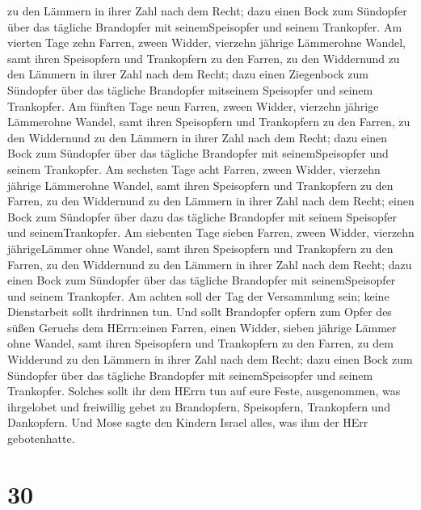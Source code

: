 zu den Lämmern in ihrer Zahl nach dem Recht;  dazu einen
Bock zum Sündopfer über das tägliche Brandopfer mit seinemSpeisopfer und
seinem Trankopfer.  Am vierten Tage zehn Farren, zween
Widder, vierzehn jährige Lämmerohne Wandel,  samt ihren
Speisopfern und Trankopfern zu den Farren, zu den Widdernund zu den
Lämmern in ihrer Zahl nach dem Recht;  dazu einen
Ziegenbock zum Sündopfer über das tägliche Brandopfer mitseinem
Speisopfer und seinem Trankopfer.  Am fünften Tage neun
Farren, zween Widder, vierzehn jährige Lämmerohne Wandel, 
samt ihren Speisopfern und Trankopfern zu den Farren, zu den Widdernund
zu den Lämmern in ihrer Zahl nach dem Recht;  dazu einen
Bock zum Sündopfer über das tägliche Brandopfer mit seinemSpeisopfer und
seinem Trankopfer.  Am sechsten Tage acht Farren, zween
Widder, vierzehn jährige Lämmerohne Wandel,  samt ihren
Speisopfern und Trankopfern zu den Farren, zu den Widdernund zu den
Lämmern in ihrer Zahl nach dem Recht; einen Bock zum Sündopfer über
 dazu das tägliche Brandopfer mit seinem Speisopfer und
seinemTrankopfer.  Am siebenten Tage sieben Farren, zween
Widder, vierzehn jährigeLämmer ohne Wandel,  samt ihren
Speisopfern und Trankopfern zu den Farren, zu den Widdernund zu den
Lämmern in ihrer Zahl nach dem Recht;  dazu einen Bock zum
Sündopfer über das tägliche Brandopfer mit seinemSpeisopfer und seinem
Trankopfer.  Am achten soll der Tag der Versammlung sein;
keine Dienstarbeit sollt ihrdrinnen tun.  Und sollt
Brandopfer opfern zum Opfer des süßen Geruchs dem HErrn:einen Farren,
einen Widder, sieben jährige Lämmer ohne Wandel,  samt
ihren Speisopfern und Trankopfern zu den Farren, zu dem Widderund zu den
Lämmern in ihrer Zahl nach dem Recht;  dazu einen Bock zum
Sündopfer über das tägliche Brandopfer mit seinemSpeisopfer und seinem
Trankopfer.  Solches sollt ihr dem HErrn tun auf eure
Feste, ausgenommen, was ihrgelobet und freiwillig gebet zu Brandopfern,
Speisopfern, Trankopfern und Dankopfern.  Und Mose sagte
den Kindern Israel alles, was ihm der HErr gebotenhatte.

\hypertarget{section-29}{%
\section{30}\label{section-29}}

